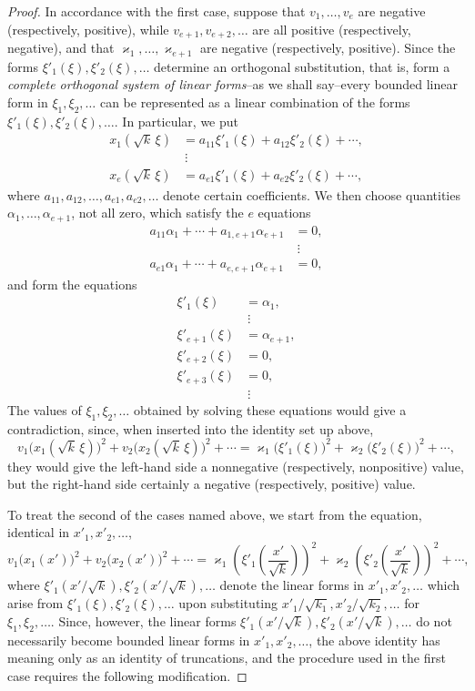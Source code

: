 \documentclass[b5paper,twoside]{article}
\newcommand{\originalpage}[1]{\phantomsection\label{origpage:#1}}
\begin{document}
\begin{proof}
In accordance with the first case, suppose that $v_1,\ldots,v_e$ are
negative (respectively, positive), while
$v_{e+1},v_{e+2},\ldots$ are all positive (respectively, negative), and that
$\varkappa_1,\ldots,\varkappa_{e+1}$ are negative (respectively, positive).
Since the forms $\xi'_1(\xi),\xi'_2(\xi),\ldots$ determine an orthogonal
substitution, that is, form a \emph{complete orthogonal system of linear
forms}--as we shall say--every bounded linear form in
$\xi_1,\xi_2,\ldots$ can be represented as a linear combination of the
forms $\xi'_1(\xi),\xi'_2(\xi),\ldots$. In particular, we put
\begin{align*}
  x_1(\sqrt{k}\,\xi)
    &=a_{11}\xi'_1(\xi)+a_{12}\xi'_2(\xi)+\cdots,\\
  &\ \vdots\\
  x_e(\sqrt{k}\,\xi)
    &=a_{e1}\xi'_1(\xi)+a_{e2}\xi'_2(\xi)+\cdots,
\end{align*}
where $a_{11},a_{12},\ldots,a_{e1},a_{e2},\ldots$ denote certain
coefficients. We then choose quantities
$\alpha_1,\ldots,\alpha_{e+1}$, not all zero, which satisfy the $e$ equations
\begin{align*}
  a_{11}\alpha_1+\cdots+a_{1,e+1}\alpha_{e+1}&=0,\\
  &\ \vdots\\
  a_{e1}\alpha_1+\cdots+a_{e,e+1}\alpha_{e+1}&=0,
\end{align*}
and form the equations
\originalpage{213}
\begin{align*}
  \xi'_1(\xi)&=\alpha_1,\\
  &\ \vdots\\
  \xi'_{e+1}(\xi)&=\alpha_{e+1},\\
  \xi'_{e+2}(\xi)&=0,\\
  \xi'_{e+3}(\xi)&=0,\\
  &\ \vdots
\end{align*}
The values of $\xi_1,\xi_2,\ldots$ obtained by solving these equations would
give a contradiction, since, when inserted into the identity set up above,
\[
  v_1\bigl(x_1(\sqrt{k}\,\xi)\bigr)^2
  +v_2\bigl(x_2(\sqrt{k}\,\xi)\bigr)^2+\cdots
  =\varkappa_1\bigl(\xi'_1(\xi)\bigr)^2
  +\varkappa_2\bigl(\xi'_2(\xi)\bigr)^2+\cdots,
\]
they would give the left-hand side a nonnegative (respectively,
nonpositive) value, but the right-hand side certainly a negative
(respectively, positive) value.

To treat the second of the cases named above, we start from the equation,
identical in $x'_1,x'_2,\ldots$,
\[
  v_1\bigl(x_1(x')\bigr)^2+v_2\bigl(x_2(x')\bigr)^2+\cdots
  =\varkappa_1\left(\xi'_1\!\left(\frac{x'}{\sqrt{k}}\right)\right)^2
  +\varkappa_2\left(\xi'_2\!\left(\frac{x'}{\sqrt{k}}\right)\right)^2
  +\cdots,
\]
where
$\xi'_1(x'/\sqrt{k}),\xi'_2(x'/\sqrt{k}),\ldots$ denote the linear forms
in $x'_1,x'_2,\ldots$ which arise from
$\xi'_1(\xi),\xi'_2(\xi),\ldots$ upon substituting
$x'_1/\sqrt{k_1},x'_2/\sqrt{k_2},\ldots$ for
$\xi_1,\xi_2,\ldots$. Since, however, the linear forms
$\xi'_1(x'/\sqrt{k}),\xi'_2(x'/\sqrt{k}),\ldots$ do not necessarily become
bounded linear forms in $x'_1,x'_2,\ldots$, the above identity has meaning
only as an identity of truncations, and the procedure used in the first case
requires the following modification.


\end{proof}
\end{document}
